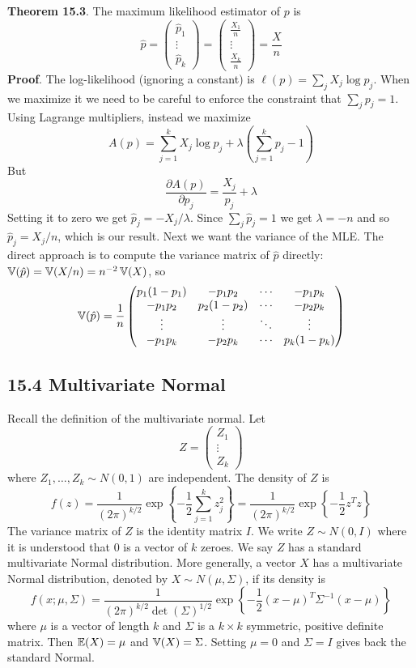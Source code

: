 \textbf{Theorem 15.3}. The maximum likelihood estimator of \(p\) is
\[
\hat{p} 
= \begin{pmatrix} \hat{p}_{1} \\ \vdots \\ \hat{p}_{k} \end{pmatrix}
= \begin{pmatrix} \frac{X_{1}}{n} \\ \vdots \\ \frac{X_{k}}{n} \end{pmatrix}
= \frac{X}{n}
\]
\textbf{Proof}. The log-likelihood (ignoring a constant) is
\(\ell(p) = \sum_{j} X_{j} \log p_{j}\). When we maximize it we need to be
careful to enforce the constraint that \(\sum_{j} p_{j} = 1\). Using
Lagrange multipliers, instead we maximize
\[
A(p) = \sum_{j=1}^{k} X_{j} \log p_{j} + \lambda \left( \sum_{j=1}^{k} p_{j} - 1 \right)
\]
But
\[
\frac{\partial A(p)}{\partial p_{j}} = \frac{X_{j}}{p_{j}} + \lambda
\]
Setting it to zero we get \(\hat{p}_{j} = - X_{j} / \lambda\). Since
\(\sum_{j} \hat{p}_{j} = 1\) we get \(\lambda = -n\) and so
\(\hat{p}_{j} = X_{j} / n\), which is our result.
Next we want the variance of the MLE. The direct approach is to compute
the variance matrix of \(\hat{p}\) directly:
\(\operatorname{\mathbb{V}}(\hat{p}) = \operatorname{\mathbb{V}}(X / n) = n^{-2} \operatorname{\mathbb{V}}(X)\), so
\[
\operatorname{\mathbb{V}}(\hat{p}) = \frac{1}{n} \begin{pmatrix}
p_{1}(1 - p_{1}) & -p_{1}p_{2} & \cdots & -p_{1}p_{k} \\
-p_{1}p_{2} & p_{2}(1 - p_{2}) & \cdots & -p_{2}p_{k} \\
\vdots & \vdots & \ddots & \vdots \\
-p_{1}p_{k} & -p_{2}p_{k} & \cdots & p_{k}(1 - p_{k})
\end{pmatrix}
\]

\subsection*{15.4 Multivariate Normal}\label{multivariate:normal}
Recall the definition of the multivariate normal. Let
\[
Z = \begin{pmatrix} Z_{1} \\ \vdots \\ Z_{k} \end{pmatrix}
\]
where \(Z_{1}, \dots, Z_{k} \sim N(0, 1)\) are independent. The density of
\(Z\) is
\[
f(z) = \frac{1}{(2\pi)^{k / 2}} \exp \left\{ -\frac{1}{2} \sum_{j=1}^{k} z_{j}^{2} \right\} = \frac{1}{(2\pi)^{k / 2}} \exp \left\{ -\frac{1}{2} z^T z \right\}
\]
The variance matrix of \(Z\) is the identity matrix \(I\). We write
\(Z \sim N(0, I)\) where it is understood that \(0\) is a vector of
\(k\) zeroes. We say \(Z\) has a standard multivariate Normal
distribution.
More generally, a vector \(X\) has a multivariate Normal distribution,
denoted by \(X \sim N(\mu, \Sigma)\), if its density is
\[
f(x; \mu, \Sigma) = \frac{1}{(2 \pi)^{k / 2} \det(\Sigma)^{1/2}} \exp \left\{ -\frac{1}{2} (x - \mu)^T \Sigma^{-1} (x - \mu)\right\}
\]
where \(\mu\) is a vector of length \(k\) and \(\Sigma\) is a
\(k \times k\) symmetric, positive definite matrix. Then
\(\operatorname{\mathbb{E}}(X) = \mu\) and \(\operatorname{\mathbb{V}}(X) = \Sigma\). Setting
\(\mu = 0\) and \(\Sigma = I\) gives back the standard Normal.

